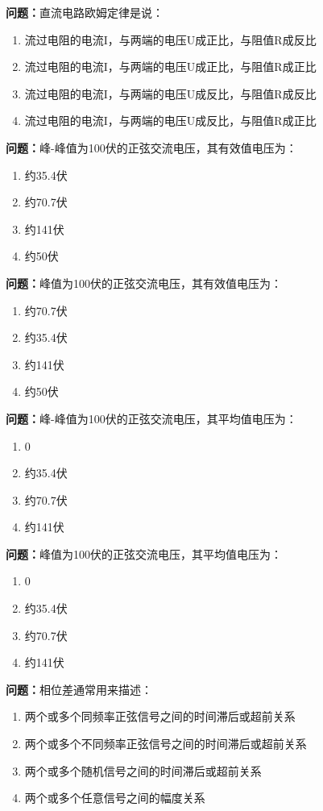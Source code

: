 \documentclass{ctexbook}
\begin{document}
\textbf{问题：}直流电路欧姆定律是说：
\begin{enumerate}[label=\Alph*), leftmargin=3em]
\item 流过电阻的电流I，与两端的电压U成正比，与阻值R成反比
\item 流过电阻的电流I，与两端的电压U成正比，与阻值R成正比
\item 流过电阻的电流I，与两端的电压U成反比，与阻值R成反比
\item 流过电阻的电流I，与两端的电压U成反比，与阻值R成正比
\end{enumerate}

\textbf{问题：}峰-峰值为100伏的正弦交流电压，其有效值电压为：
\begin{enumerate}[label=\Alph*), leftmargin=3em]
\item 约35.4伏
\item 约70.7伏
\item 约141伏
\item 约50伏
\end{enumerate}

\textbf{问题：}峰值为100伏的正弦交流电压，其有效值电压为：
\begin{enumerate}[label=\Alph*), leftmargin=3em]
\item 约70.7伏
\item 约35.4伏
\item 约141伏
\item 约50伏
\end{enumerate}

\textbf{问题：}峰-峰值为100伏的正弦交流电压，其平均值电压为：
\begin{enumerate}[label=\Alph*), leftmargin=3em]
\item 0
\item 约35.4伏
\item 约70.7伏
\item 约141伏
\end{enumerate}

\textbf{问题：}峰值为100伏的正弦交流电压，其平均值电压为：
\begin{enumerate}[label=\Alph*), leftmargin=3em]
\item 0
\item 约35.4伏
\item 约70.7伏
\item 约141伏
\end{enumerate}

\textbf{问题：}相位差通常用来描述：
\begin{enumerate}[label=\Alph*), leftmargin=3em]
\item 两个或多个同频率正弦信号之间的时间滞后或超前关系
\item 两个或多个不同频率正弦信号之间的时间滞后或超前关系
\item 两个或多个随机信号之间的时间滞后或超前关系
\item 两个或多个任意信号之间的幅度关系
\end{enumerate}
\end{document}
